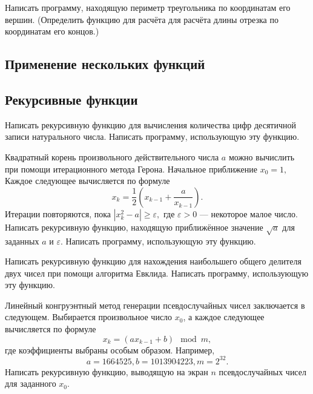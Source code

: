 \task Написать программу, находящую периметр треугольника по
координатам его вершин. (Определить функцию для расчёта для расчёта
длины отрезка по координатам его концов.)

\task

\task

\task

\task

\subsection{Применение нескольких функций}

\task

\task

\task

\task

\task

\task

\task

\task

\task

\task

\subsection{Рекурсивные функции}

\task Написать рекурсивную функцию для вычисления количества цифр
десятичной записи натурального числа. Написать программу, использующую
эту функцию.

\task Квадратный корень произвольного действительного числа $a$ можно
вычислить при помощи итерационного метода Герона. Начальное
приближение $x_0 = 1,$ Каждое следующее вычисляется по формуле
\[
x_k = \frac12 \left( x_{k-1} + \frac{a}{x_{k-1}} \right).
\]
Итерации повторяются, пока $\left| x_k^2 - a \right| \geqslant
\varepsilon,$ где $\varepsilon > 0$ — некоторое малое число.  Написать
рекурсивную функцию, находящую приближённое значение $\sqrt{a}$ для
заданных $a$ и $\varepsilon.$ Написать программу, использующую эту
функцию.

\task Написать рекурсивную функцию для нахождения наибольшего общего
делителя двух чисел при помощи алгоритма Евклида. Написать программу,
использующую эту функцию.

\task Линейный конгруэнтный метод генерации псевдослучайных чисел
заключается в следующем. Выбирается произвольное число $x_0$, а каждое
следующее вычисляется по формуле
\[
x_k = (ax_{k-1} + b) \mod m,
\]
где коэффициенты выбраны особым образом. Например,
\[
a = 1664525,
b = 1013904223,
m = 2^{32}.
\]
Написать рекурсивную функцию, выводящую на экран $n$ псевдослучайных
чисел для заданного $x_0$.

